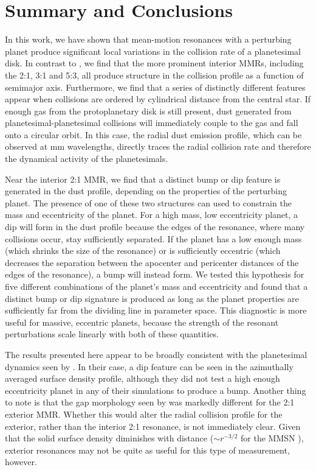 \documentclass[twocolumn]{aastex63}
\begin{document}
\section{Summary and Conclusions}\label{sec:conclusions}

In this work, we have shown that mean-motion resonances with a perturbing planet produce significant local variations in the collision rate of a 
planetesimal disk. In contrast to \citet{2000Icar..143...45R}, we find that the more prominent interior MMRs, including the 2:1, 3:1 and 5:3, all 
produce structure in the collision profile as a function of semimajor axis. Furthermore, we find that a series of distinctly different features appear 
when collisions are ordered by cylindrical distance from the central star. If enough gas from the protoplanetary disk is still present, dust generated 
from planetesimal-planetesimal collisions will immediately couple to the gas and fall onto a circular orbit. In this case, the radial dust emission profile, 
which can be observed at mm wavelengths, directly traces the radial collision rate and therefore the dynamical activity of the planetesimals.

Near the interior 2:1 MMR, we find that a distinct bump or dip feature is generated in the dust profile, depending on the properties of the perturbing 
planet. The presence of one of these two structures can used to constrain the mass and eccentricity of the planet. For a high mass, low eccentricity 
planet, a dip will form in the dust profile because the edges of the resonance, where many collisions occur, stay sufficiently separated. If the planet 
has a low enough mass (which shrinks the size of the resonance) or is sufficiently eccentric (which decreases the separation between the apocenter 
and pericenter distances of the edges of the resonance), a bump will instead form. We tested this hypothesis for five different combinations of the 
planet's mass and eccentricity and found that a distinct bump or dip signature is produced as long as the planet properties are sufficiently far from 
the dividing line in parameter space. This diagnostic is more useful for massive, eccentric planets, because the strength of the resonant 
perturbations scale linearly with both of these quantities.

The results presented here appear to be broadly consistent with the planetesimal dynamics seen by \citet{2016ApJ...818..159T}. In their case, a dip 
feature can be seen in the azimuthally averaged surface density profile, although they did not test a high enough eccentricity planet in any of their 
simulations to produce a bump. Another thing to note is that the gap morphology seen by \citet{2016ApJ...818..159T} was markedly different for the 
2:1 exterior MMR. Whether this would alter the radial collision profile for the exterior, rather than the interior 2:1 resonance, is not immediately clear.  
Given that the solid surface density diminishes with distance ($\sim r^{-3/2}$ for the MMSN \citep{1981PThPS..70...35H}), exterior resonances may 
not be quite as useful for this type of measurement, however.
\end{document}
